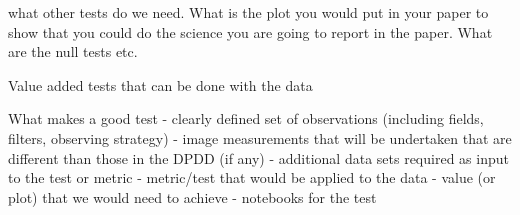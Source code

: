 \documentclass[modern]{desc-tex/styles/lsstdescnote}
\begin{document}
what other tests do we need. What is the plot you would put in your paper to show that you could do the science you are going to report in the paper. What are the null tests etc.


\begin{acknowledgments}

\end{acknowledgments}
  



\appendix

Value added tests that can be done with the data

What makes a good test
- clearly defined set of observations (including fields, filters, observing strategy)
- image measurements that will be undertaken that are different than those in the DPDD (if any)
- additional data sets required as input to the test or metric
- metric/test that would be applied to the data
- value (or plot) that we would need to achieve
- notebooks for the test
\end{document}
